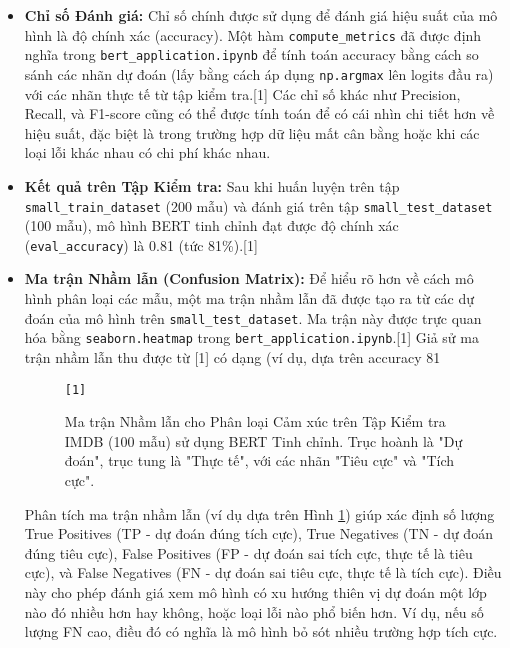 \begin{itemize}
    \item \textbf{Chỉ số Đánh giá:}
    Chỉ số chính được sử dụng để đánh giá hiệu suất của mô hình là độ chính xác (accuracy). Một hàm \texttt{compute\_metrics} đã được định nghĩa trong \texttt{bert\_application.ipynb} để tính toán accuracy bằng cách so sánh các nhãn dự đoán (lấy bằng cách áp dụng \texttt{np.argmax} lên logits đầu ra) với các nhãn thực tế từ tập kiểm tra.[1] Các chỉ số khác như Precision, Recall, và F1-score cũng có thể được tính toán để có cái nhìn chi tiết hơn về hiệu suất, đặc biệt là trong trường hợp dữ liệu mất cân bằng hoặc khi các loại lỗi khác nhau có chi phí khác nhau.

    \item \textbf{Kết quả trên Tập Kiểm tra:}
    Sau khi huấn luyện trên tập \texttt{small\_train\_dataset} (200 mẫu) và đánh giá trên tập \texttt{small\_test\_dataset} (100 mẫu), mô hình BERT tinh chỉnh đạt được độ chính xác (\texttt{eval\_accuracy}) là 0.81 (tức 81\%).[1]

    \item \textbf{Ma trận Nhầm lẫn (Confusion Matrix):}
    Để hiểu rõ hơn về cách mô hình phân loại các mẫu, một ma trận nhầm lẫn đã được tạo ra từ các dự đoán của mô hình trên \texttt{small\_test\_dataset}. Ma trận này được trực quan hóa bằng \texttt{seaborn.heatmap} trong \texttt{bert\_application.ipynb}.[1]
    Giả sử ma trận nhầm lẫn thu được từ [1] có dạng (ví dụ, dựa trên accuracy 81%
    \begin{figure}[H]
        \centering
        \texttt{[1]}
        \caption{Ma trận Nhầm lẫn cho Phân loại Cảm xúc trên Tập Kiểm tra IMDB (100 mẫu) sử dụng BERT Tinh chỉnh. Trục hoành là "Dự đoán", trục tung là "Thực tế", với các nhãn "Tiêu cực" và "Tích cực".}
        \label{fig:confusion_matrix_bert_finetuned_rewrite}
    \end{figure}
    Phân tích ma trận nhầm lẫn (ví dụ dựa trên Hình \ref{fig:confusion_matrix_bert_finetuned_rewrite}) giúp xác định số lượng True Positives (TP - dự đoán đúng tích cực), True Negatives (TN - dự đoán đúng tiêu cực), False Positives (FP - dự đoán sai tích cực, thực tế là tiêu cực), và False Negatives (FN - dự đoán sai tiêu cực, thực tế là tích cực). Điều này cho phép đánh giá xem mô hình có xu hướng thiên vị dự đoán một lớp nào đó nhiều hơn hay không, hoặc loại lỗi nào phổ biến hơn. Ví dụ, nếu số lượng FN cao, điều đó có nghĩa là mô hình bỏ sót nhiều trường hợp tích cực.


\end{itemize}
